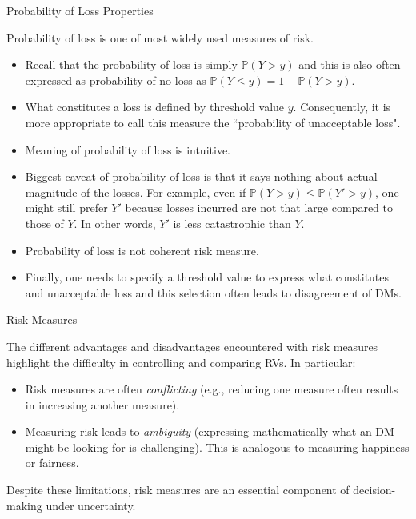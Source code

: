 \documentclass[9pt]{beamer}
\begin{document}
%
\begin{frame}{Probability of Loss Properties}


Probability of loss is one of most widely used measures of risk.  

\begin{itemize}
\setlength{\itemsep}{10pt}
\item Recall that the probability of loss is simply $\mathbb{P}(Y>y)$ and this is also often expressed as probability of no loss as $\mathbb{P}(Y\leq y)=1-\mathbb{P}(Y>y)$. 

\item What constitutes a loss is defined by threshold value $y$. Consequently, it is more appropriate to call this measure the  ``probability of unacceptable loss". 

\item Meaning of probability of loss is intuitive. 

\item Biggest caveat of probability of loss is that it says nothing about actual magnitude of the losses.  For example, even if $\mathbb{P}(Y>y)\leq \mathbb{P}(Y'>y)$, one might still prefer $Y'$ because losses incurred are not that large compared to those of $Y$.  In other words, $Y'$ is less catastrophic than $Y$. 

\item Probability of loss is not coherent risk measure. 

\item Finally, one needs to specify a threshold value to express what constitutes and unacceptable loss and this selection often leads to disagreement of DMs.

\end{itemize}

\end{frame}


%
\begin{frame}{Risk Measures}

The different advantages and disadvantages encountered with risk measures highlight the difficulty in controlling and comparing RVs. In particular:

\begin{itemize}
\setlength{\itemsep}{10pt}
\item Risk measures are often {\em conflicting} (e.g., reducing one measure often results in increasing another measure). 
\item Measuring risk leads to {\em ambiguity} (expressing mathematically what an DM might be looking for is challenging). This is analogous to measuring happiness or fairness. 
\end{itemize}
Despite these limitations, risk measures are an essential component of decision-making under uncertainty.

\end{frame}
\end{document}
